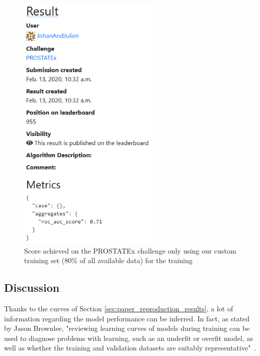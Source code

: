 \begin{figure}[!t]
\centering
\includegraphics[width=0.6\textwidth, keepaspectratio=true]{./figures/paper_reproduction_results_challenge1.png}
\caption{Score achieved on the PROSTATEx challenge only using our custom training set (80\% of all available data) for the training}
\label{fig:paper_reproduction_results_challenge_1}
\end{figure}


\subsection{Discussion}
\setlength{\marginparwidth}{3cm}\leavevmode {}Thanks to the curves of Section \ref{sec:paper_reproduction_results}, a lot of information regarding the model performance can be inferred. In fact, as stated by Jason Brownlee, "reviewing learning curves of models during training can be used to diagnose problems with learning, such as an underfit or overfit model, as well as whether the training and validation datasets are suitably representative"~\cite{40}.

